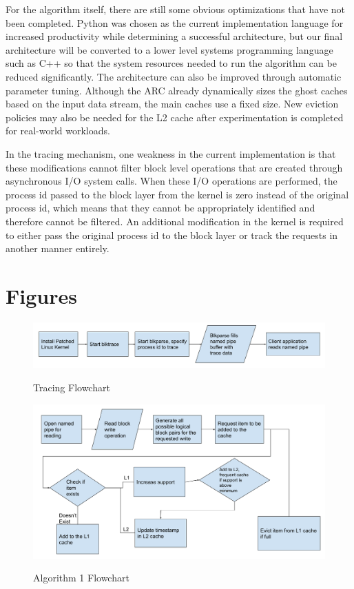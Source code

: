 \documentclass[MEng]{uofl}
\begin{document}
For the algorithm itself, there are still some obvious optimizations that have not been completed. Python was chosen as the current implementation language for increased productivity while determining a successful architecture, but our final architecture will be converted to a lower level systems programming language such as C++ so that the system resources needed to run the algorithm can be reduced significantly. The architecture can also be improved through automatic parameter tuning. Although the ARC already dynamically sizes the ghost caches based on the input data stream, the main caches use a fixed size. New eviction policies may also be needed for the L2 cache after experimentation is completed for real-world workloads. 

In the tracing mechanism, one weakness in the current implementation is that these modifications cannot filter block level operations that are created through asynchronous I/O system calls. When these I/O operations are performed, the process id passed to the block layer from the kernel is zero instead of the original process id, which means that they cannot be appropriately identified and therefore cannot be filtered. An additional modification in the kernel is required to either pass the original process id to the block layer or track the requests in another manner entirely. 

\appendix
\chapter{Figures}
\begin{figure}
    \caption{Tracing Flowchart}
    \includegraphics[width=\columnwidth]{d1.png}
    \label{tracingf}
\end{figure}

\begin{figure}
    \caption{Algorithm 1 Flowchart}
    \includegraphics[width=\columnwidth]{d2.png}
    \label{a1}
\end{figure}
\end{document}
